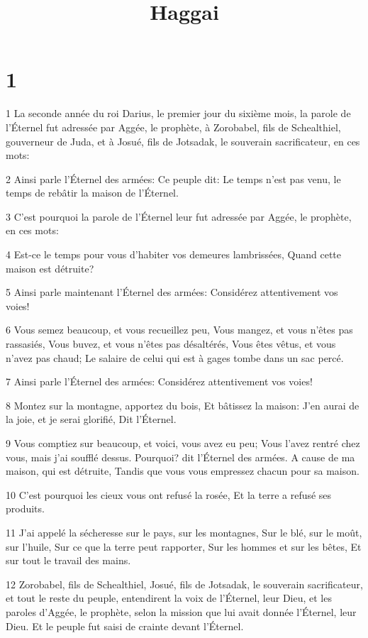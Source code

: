 

\title{Haggai}


\chapter{1}

\par 1 La seconde année du roi Darius, le premier jour du sixième mois, la parole de l'Éternel fut adressée par Aggée, le prophète, à Zorobabel, fils de Schealthiel, gouverneur de Juda, et à Josué, fils de Jotsadak, le souverain sacrificateur, en ces mots:
\par 2 Ainsi parle l'Éternel des armées: Ce peuple dit: Le temps n'est pas venu, le temps de rebâtir la maison de l'Éternel.
\par 3 C'est pourquoi la parole de l'Éternel leur fut adressée par Aggée, le prophète, en ces mots:
\par 4 Est-ce le temps pour vous d'habiter vos demeures lambrissées, Quand cette maison est détruite?
\par 5 Ainsi parle maintenant l'Éternel des armées: Considérez attentivement vos voies!
\par 6 Vous semez beaucoup, et vous recueillez peu, Vous mangez, et vous n'êtes pas rassasiés, Vous buvez, et vous n'êtes pas désaltérés, Vous êtes vêtus, et vous n'avez pas chaud; Le salaire de celui qui est à gages tombe dans un sac percé.
\par 7 Ainsi parle l'Éternel des armées: Considérez attentivement vos voies!
\par 8 Montez sur la montagne, apportez du bois, Et bâtissez la maison: J'en aurai de la joie, et je serai glorifié, Dit l'Éternel.
\par 9 Vous comptiez sur beaucoup, et voici, vous avez eu peu; Vous l'avez rentré chez vous, mais j'ai soufflé dessus. Pourquoi? dit l'Éternel des armées. A cause de ma maison, qui est détruite, Tandis que vous vous empressez chacun pour sa maison.
\par 10 C'est pourquoi les cieux vous ont refusé la rosée, Et la terre a refusé ses produits.
\par 11 J'ai appelé la sécheresse sur le pays, sur les montagnes, Sur le blé, sur le moût, sur l'huile, Sur ce que la terre peut rapporter, Sur les hommes et sur les bêtes, Et sur tout le travail des mains.
\par 12 Zorobabel, fils de Schealthiel, Josué, fils de Jotsadak, le souverain sacrificateur, et tout le reste du peuple, entendirent la voix de l'Éternel, leur Dieu, et les paroles d'Aggée, le prophète, selon la mission que lui avait donnée l'Éternel, leur Dieu. Et le peuple fut saisi de crainte devant l'Éternel.
